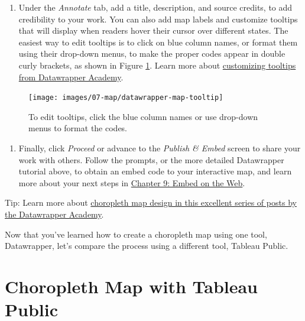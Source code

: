 \documentclass[
  english,
]{book}
\providecommand{\tightlist}{%
  \setlength{\itemsep}{0pt}\setlength{\parskip}{0pt}}
\begin{document}
\begin{enumerate}
\def\labelenumi{\arabic{enumi}.}
\setcounter{enumi}{12}
\tightlist
\item
  Under the \emph{Annotate} tab, add a title, description, and source credits, to add credibility to your work. You can also add map labels and customize tooltips that will display when readers hover their cursor over different states. The easiest way to edit tooltips is to click on blue column names, or format them using their drop-down menus, to make the proper codes appear in double curly brackets, as shown in Figure \ref{fig:datawrapper-map-tooltip}. Learn more about \href{https://academy.datawrapper.de/article/116-how-to-create-useful-tooltips-for-your-maps}{customizing tooltips from Datawrapper Academy}.
\end{enumerate}



\begin{figure}
\texttt{[image: images/07-map/datawrapper-map-tooltip]} \caption{To edit tooltips, click the blue column names or use drop-down menus to format the codes.}\label{fig:datawrapper-map-tooltip}
\end{figure}

\begin{enumerate}
\def\labelenumi{\arabic{enumi}.}
\setcounter{enumi}{13}
\tightlist
\item
  Finally, click \emph{Proceed} or advance to the \emph{Publish \& Embed} screen to share your work with others. Follow the prompts, or the more detailed Datawrapper tutorial above, to obtain an embed code to your interactive map, and learn more about your next steps in \href{embed.html}{Chapter 9: Embed on the Web}.
\end{enumerate}

Tip: Learn more about \href{https://academy.datawrapper.de/category/93-maps}{choropleth map design in this excellent series of posts by the Datawrapper Academy}.

Now that you've learned how to create a choropleth map using one tool, Datawrapper, let's compare the process using a different tool, Tableau Public.

\hypertarget{map-tableau}{%
\section*{Choropleth Map with Tableau Public}\label{map-tableau}}
\end{document}

